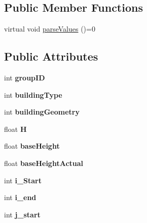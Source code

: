 \subsection*{Public Member Functions}
\begin{DoxyCompactItemize}
\item 
virtual void \hyperlink{classBuilding_a7782e7933a009fcfee4d186e62d34b43}{parse\+Values} ()=0
\end{DoxyCompactItemize}
\subsection*{Public Attributes}
\begin{DoxyCompactItemize}
\item 
\mbox{\label{classBuilding_a29af720d04ca4fafa0881ca73f7ce54b}} 
int {\bfseries group\+ID}
\item 
\mbox{\label{classBuilding_a35ee8dac0d2288329bb10cb78af996a1}} 
int {\bfseries building\+Type}
\item 
\mbox{\label{classBuilding_aa8753ccee0f2dd6144c418e9cf08e41e}} 
int {\bfseries building\+Geometry}
\item 
\mbox{\label{classBuilding_a0e34228cdc88c79f58d0cee0f445965c}} 
float {\bfseries H}
\item 
\mbox{\label{classBuilding_a23e46ffbb553247f8c29f59c4e97a8eb}} 
float {\bfseries base\+Height}
\item 
\mbox{\label{classBuilding_a7cf1f72edd89f924da35292d923254c9}} 
float {\bfseries base\+Height\+Actual}
\item 
\mbox{\label{classBuilding_aec20efa3786ccaabe32efbda691bc590}} 
int {\bfseries i\+\_\+\+Start}
\item 
\mbox{\label{classBuilding_a9db428412881d49d12652a324c7cfb4e}} 
int {\bfseries i\+\_\+end}
\item 
\mbox{\label{classBuilding_a00f6578807f04108df0495ded977fa63}} 
int {\bfseries j\+\_\+start}
\item 
\mbox{\label{classBuilding_ab64d69b96f6a7b2378638e4b83bcf87e}} 

\end{DoxyCompactItemize}
